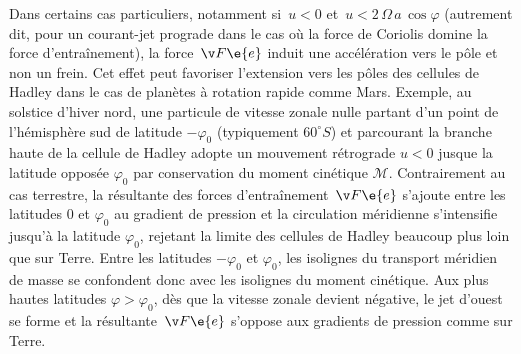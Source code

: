 \sk 
Dans certains cas particuliers, notamment si~$u<0$ et~$u<2 \, \Omega \, a \, \cos \varphi$ (autrement dit, pour un courant-jet prograde dans le cas où la force de Coriolis domine la force d'entraînement), la force~$\v F\e{e}$ induit une accélération vers le pôle et non un frein. Cet effet peut favoriser l'extension vers les pôles des cellules de Hadley dans le cas de planètes à rotation rapide comme Mars. Exemple, au solstice d'hiver nord, une particule de vitesse zonale nulle partant d'un point de l'hémisphère sud de latitude $-\varphi_0$ (typiquement $60^{\circ}S$) et parcourant la branche haute de la cellule de Hadley adopte un mouvement rétrograde $u<0$ jusque la latitude opposée $\varphi_0$ par conservation du moment cinétique $\mathcal{M}$. Contrairement au cas terrestre, la résultante des forces d'entraînement~$\v F\e{e}$ s'ajoute entre les latitudes $0$ et $\varphi_0$ au gradient de pression et la circulation méridienne s'intensifie jusqu'à la latitude $\varphi_0$, rejetant la limite des cellules de Hadley beaucoup plus loin que sur Terre. Entre les latitudes $-\varphi_0$ et $\varphi_0$, les isolignes du transport méridien de masse se confondent donc avec les isolignes du moment cinétique. Aux plus hautes latitudes $\varphi > \varphi_0$, dès que la vitesse zonale devient négative, le jet d'ouest se forme et la résultante~$\v F\e{e}$ s'oppose aux gradients de pression comme sur Terre.







